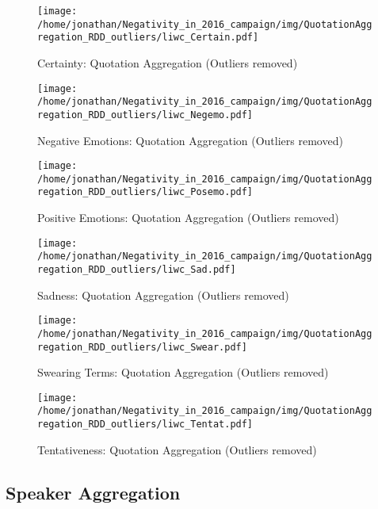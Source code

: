 \begin{figure}[h]\centering
	\texttt{[image: /home/jonathan/Negativity\_in\_2016\_campaign/img/QuotationAggregation\_RDD\_outliers/liwc\_Certain.pdf]}
	\caption{Certainty: Quotation Aggregation (Outliers removed)}
	\label{fig: qa_Certainty}
\end{figure}

\begin{figure}[h]\centering
	\texttt{[image: /home/jonathan/Negativity\_in\_2016\_campaign/img/QuotationAggregation\_RDD\_outliers/liwc\_Negemo.pdf]}
	\caption{Negative Emotions: Quotation Aggregation (Outliers removed)}
	\label{fig: qa_Negative Emotions}
\end{figure}

\begin{figure}[h]\centering
	\texttt{[image: /home/jonathan/Negativity\_in\_2016\_campaign/img/QuotationAggregation\_RDD\_outliers/liwc\_Posemo.pdf]}
	\caption{Positive Emotions: Quotation Aggregation (Outliers removed)}
	\label{fig: qa_Positive Emotions}
\end{figure}

\begin{figure}[h]\centering
	\texttt{[image: /home/jonathan/Negativity\_in\_2016\_campaign/img/QuotationAggregation\_RDD\_outliers/liwc\_Sad.pdf]}
	\caption{Sadness: Quotation Aggregation (Outliers removed)}
	\label{fig: qa_Sadness}
\end{figure}

\begin{figure}[h]\centering
	\texttt{[image: /home/jonathan/Negativity\_in\_2016\_campaign/img/QuotationAggregation\_RDD\_outliers/liwc\_Swear.pdf]}
	\caption{Swearing Terms: Quotation Aggregation (Outliers removed)}
	\label{fig: qa_Swearing Terms}
\end{figure}

\begin{figure}[h]\centering
	\texttt{[image: /home/jonathan/Negativity\_in\_2016\_campaign/img/QuotationAggregation\_RDD\_outliers/liwc\_Tentat.pdf]}
	\caption{Tentativeness: Quotation Aggregation (Outliers removed)}
	\label{fig: qa_Tentativeness}
\end{figure}

\clearpage
\pagebreak

\subsection{Speaker Aggregation}

